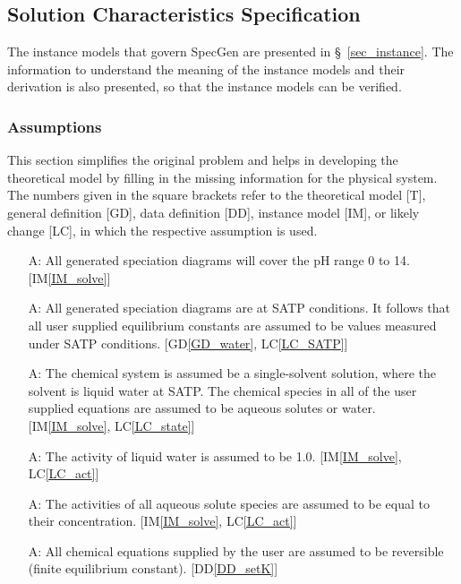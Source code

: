\documentclass[12pt]{article}
\newcommand{\dref}[1]{GD\ref{#1}}
\newcommand{\ddref}[1]{DD\ref{#1}}
\newcounter{assumpnum} %
\newcommand{\iref}[1]{IM\ref{#1}}
\newcommand{\lcref}[1]{LC\ref{#1}}
\newcommand{\sref}[1]{\S~\ref{#1}}
\newcommand{\progname}{SpecGen} %
\begin{document}

\subsection{Solution Characteristics Specification}

The instance models that govern \progname{} are presented in 
\sref{sec_instance}. The information to understand the meaning of the instance 
models and their derivation is also presented, so that the instance models can 
be verified.

\subsubsection{Assumptions}

This section simplifies the original problem and helps in developing the
theoretical model by filling in the missing information for the physical
system. The numbers given in the square brackets refer to the theoretical model
[T], general definition [GD], data definition [DD], instance model [IM], or
likely change [LC], in which the respective assumption is used.

\begin{itemize}
\item[A\refstepcounter{assumpnum}\theassumpnum \label{A_pH}:]
  All generated speciation diagrams will cover the pH range 0 to 14. 
  [\iref{IM_solve}]
\item[A\refstepcounter{assumpnum}\theassumpnum \label{A_SATP}:]
  All generated speciation diagrams are at SATP conditions.  It follows that 
  all user supplied equilibrium constants are assumed to be values measured 
  under SATP conditions. [\dref{GD_water}, \lcref{LC_SATP}]
\item[A\refstepcounter{assumpnum}\theassumpnum \label{A_only_aq}:]
  The chemical system is assumed be a single-solvent solution, where the solvent 
  is liquid water at SATP.  The chemical species in all of the user supplied 
  equations are assumed to be aqueous solutes or water. [\iref{IM_solve}, 
  \lcref{LC_state}]
\item[A\refstepcounter{assumpnum}\theassumpnum \label{A_act_wat}:]
  The activity of liquid water is assumed to be 1.0. [\iref{IM_solve}, 
  \lcref{LC_act}]
\item[A\refstepcounter{assumpnum}\theassumpnum \label{A_act_aq}:]
  The activities of all aqueous solute species are assumed to be equal to 
  their concentration. [\iref{IM_solve}, \lcref{LC_act}]
\item[A\refstepcounter{assumpnum}\theassumpnum \label{A_rev}:]
  All chemical equations supplied by the user are assumed to be reversible 
  (finite equilibrium constant). [\ddref{DD_setK}]
\end{itemize}
\end{document}
